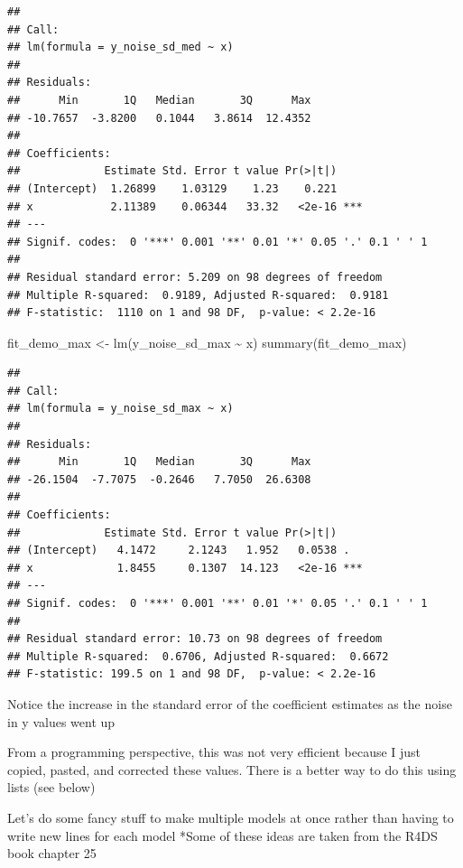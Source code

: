 \documentclass[
]{book}
\newenvironment{Shaded}{\begin{snugshade}}{\end{snugshade}}
\newcommand{\FunctionTok}[1]{\textcolor[rgb]{0.00,0.00,0.00}{#1}}
\newcommand{\NormalTok}[1]{#1}
\newcommand{\OtherTok}[1]{\textcolor[rgb]{0.56,0.35,0.01}{#1}}
\newcommand{\SpecialCharTok}[1]{\textcolor[rgb]{0.00,0.00,0.00}{#1}}
\begin{document}
\begin{verbatim}
## 
## Call:
## lm(formula = y_noise_sd_med ~ x)
## 
## Residuals:
##      Min       1Q   Median       3Q      Max 
## -10.7657  -3.8200   0.1044   3.8614  12.4352 
## 
## Coefficients:
##             Estimate Std. Error t value Pr(>|t|)    
## (Intercept)  1.26899    1.03129    1.23    0.221    
## x            2.11389    0.06344   33.32   <2e-16 ***
## ---
## Signif. codes:  0 '***' 0.001 '**' 0.01 '*' 0.05 '.' 0.1 ' ' 1
## 
## Residual standard error: 5.209 on 98 degrees of freedom
## Multiple R-squared:  0.9189, Adjusted R-squared:  0.9181 
## F-statistic:  1110 on 1 and 98 DF,  p-value: < 2.2e-16
\end{verbatim}

\begin{Shaded}
\begin{Highlighting}[]
\NormalTok{fit\_demo\_max }\OtherTok{\textless{}{-}} \FunctionTok{lm}\NormalTok{(y\_noise\_sd\_max }\SpecialCharTok{\textasciitilde{}}\NormalTok{ x)}
\FunctionTok{summary}\NormalTok{(fit\_demo\_max)}
\end{Highlighting}
\end{Shaded}

\begin{verbatim}
## 
## Call:
## lm(formula = y_noise_sd_max ~ x)
## 
## Residuals:
##      Min       1Q   Median       3Q      Max 
## -26.1504  -7.7075  -0.2646   7.7050  26.6308 
## 
## Coefficients:
##             Estimate Std. Error t value Pr(>|t|)    
## (Intercept)   4.1472     2.1243   1.952   0.0538 .  
## x             1.8455     0.1307  14.123   <2e-16 ***
## ---
## Signif. codes:  0 '***' 0.001 '**' 0.01 '*' 0.05 '.' 0.1 ' ' 1
## 
## Residual standard error: 10.73 on 98 degrees of freedom
## Multiple R-squared:  0.6706, Adjusted R-squared:  0.6672 
## F-statistic: 199.5 on 1 and 98 DF,  p-value: < 2.2e-16
\end{verbatim}

Notice the increase in the standard error of the coefficient estimates as the noise in y values went up

From a programming perspective, this was not very efficient because I just copied, pasted, and corrected these values.
There is a better way to do this using lists (see below)

Let's do some fancy stuff to make multiple models at once rather than having to write new lines for each model
*Some of these ideas are taken from the R4DS book chapter 25
\end{document}
